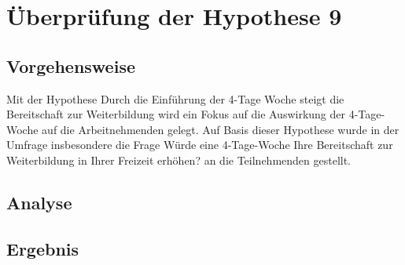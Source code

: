
\chapter{Überprüfung der Hypothese 9}
\label{chap:hypothese9}

\section{Vorgehensweise}
Mit der Hypothese \glqq{}Durch die Einführung der 4-Tage Woche steigt die Bereitschaft 
zur Weiterbildung \grqq{} wird ein Fokus auf die 
Auswirkung der 4-Tage-Woche auf die Arbeitnehmenden gelegt. Auf Basis dieser Hypothese 
wurde in der Umfrage
insbesondere die Frage \glqq{}Würde eine 4-Tage-Woche Ihre Bereitschaft zur Weiterbildung in 
Ihrer Freizeit erhöhen? \grqq{} an die Teilnehmenden gestellt.











\section{Analyse}

\section{Ergebnis}

